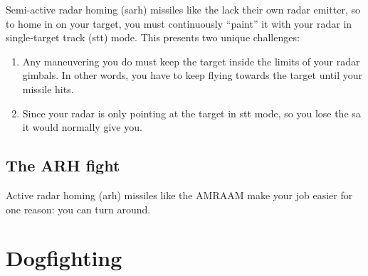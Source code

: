 Semi-active radar homing \ac{(sarh)} missiles like the 
lack their own radar emitter, so to home in on your target,
you must continuously ``paint'' it with your radar in single-target track
\ac{(stt)} mode.
This presents two unique challenges:
\begin{enumerate}
\item Any maneuvering you do must keep the target inside the limits of your radar
    gimbals. In other words,
    you have to keep flying towards the target until your missile hits.
\item Since your radar is only pointing at the target in \ac{stt} mode,
    so you lose the \ac{sa} it would normally give you.
\end{enumerate}

\section{The ARH fight}

Active radar homing \ac{(arh)} missiles like the  AMRAAM
make your job easier for one reason: you can turn around.

\chapter{Dogfighting}
